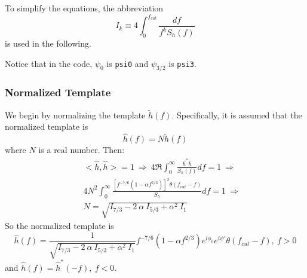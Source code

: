 To simplify the equations, the abbreviation
\begin{equation}
I_k \equiv 4 \int_0^{f_{cut}} \frac{df}{f^k S_h(f)}
\end{equation}
is used in the following.

Notice that in the code, $\psi_0$ is \texttt{psi0} and $\psi_{3/2}$ is
\texttt{psi3}.

\subsubsection*{Normalized Template}
\label{NormOfTemplate}

We begin by normalizing the template $\tilde{h}(f)$.
Specifically, it is assumed that the normalized template is
\begin{equation}
\hat{h}(f) = N \tilde{h}(f)
\end{equation}
where $N$ is a real number. Then:
\begin{eqnarray}
&& <\hat{h}, \hat{h}> = 1 \: \Rightarrow  \:
4 \Re \int_0^{\infty} \frac{\hat{h}^{\ast} \hat{h}}{S_h(f)} df = 1 \: 
	\Rightarrow  \\
&& 4 N^2 \int_0^{\infty} \frac{ [ f^{-7/6} (1-\alpha f^{2/3})]^2 \theta
	(f_{cut}-f) }{S_h} df = 1 \: \Rightarrow \\
&& N = \sqrt{ I_{7/3} - 2 \: \alpha \: I_{5/3} + \alpha^2 \: I_1 }
\label{Normalize}
\end{eqnarray}
So the normalized template is
\begin{equation}
\hat{h}(f) = \frac{1}{\sqrt{ I_{7/3} - 2 \: \alpha \: I_{5/3} + 
	\alpha^2 \: I_1 }} f^{-7/6} (1-\alpha f^{2/3}) e^{i \phi_0} e^{i \psi'}
	\theta(f_{cut}-f), \: f>0
\end{equation}
and $\hat{h}(f) = \hat{h}^{\ast}(-f), \: f<0$.

